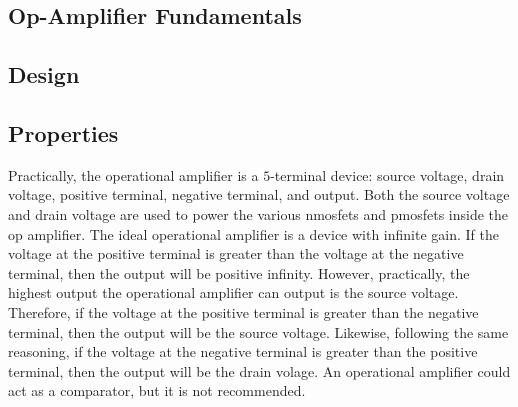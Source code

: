 \documentclass[class=report, 12pt, crop=false]{standalone}
\begin{document}
\begin{center}
\chapter{Op-Amplifier Fundamentals}
\begin{comment}
\end{comment}
\section{Design}
\begin{comment}
\end{comment}
\section{Properties}
\begin{comment}
\end{comment}
Practically, the operational amplifier is a $5$-terminal device: source voltage, drain voltage, positive terminal, negative terminal, and output. Both the source voltage and drain voltage are used to power the various nmosfets and pmosfets inside the op amplifier. The ideal operational amplifier is a device with infinite gain. If the voltage at the positive terminal is greater than the voltage at the negative terminal, then the output will be positive infinity. However, practically, the highest output the operational amplifier can output is the source voltage. Therefore, if the voltage at the positive terminal is greater than the negative terminal, then the output will be the source voltage. Likewise, following the same reasoning, if the voltage at the negative terminal is greater than the positive terminal, then the output will be the drain volage. An operational amplifier could act as a comparator, but it is not recommended.
\end{center}
\end{document}

